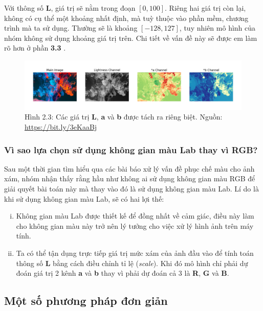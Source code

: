 \documentclass[a4paper]{article}
\begin{document}
\noindent
Với thông số \textbf{L}, giá trị sẽ nằm trong đoạn $[0, 100]$. Riêng hai giá trị còn lại, không có cụ thể một khoảng nhất định, mà tuỳ thuộc vào phần mềm, chương trình mà ta sử dụng. Thường sẽ là khoảng $[-128, 127]$, tuy nhiên mô hình của nhóm không sử dụng khoảng giá trị trên. Chi tiết về vấn đề này sẽ được em làm rõ hơn ở phần \textbf{3.3 }.

\begin{figure}[h!]
\centering
\includegraphics[width=16.1cm]{images/2_3.jpeg}
\caption{Hình 2.3: Các giá trị \textbf{L}, \textbf{a} và \textbf{b} được tách ra riêng biệt. Nguồn: \href{https://bit.ly/3eKaaBj}{https://bit.ly/3eKaaBj}}
\end{figure}

\subsubsection{Vì sao lựa chọn sử dụng không gian màu Lab thay vì RGB?}
Sau một thời gian tìm hiểu qua các bài báo xử lý vấn đề phục chế màu cho ảnh xám, nhóm nhận thấy rằng hầu như không ai sử dụng không gian màu RGB để giải quyết bài toán này mà thay vào đó là sử dụng không gian màu Lab. Lí do là khi sử dụng không gian màu Lab, sẽ có hai lợi thế:
\begin{enumerate}[i)]
    \item Không gian màu Lab được thiết kế để đồng nhất về cảm giác, điều này làm cho không gian màu này trở nên lý tưởng cho việc xử lý hình ảnh trên máy tính.
    
    \item Ta có thể tận dụng trực tiếp giá trị mức xám của ảnh đầu vào để tính toán thông số \textbf{L} bằng cách điều chỉnh tỉ lệ (\textit{scale}). Khi đó mô hình chỉ phải dự đoán giá trị 2 kênh \textbf{a} và \textbf{b} thay vì phải dự đoán cả 3 là \textbf{R}, \textbf{G} và \textbf{B}.
\end{enumerate}

\subsection{Một số phương pháp đơn giản}
\end{document}
